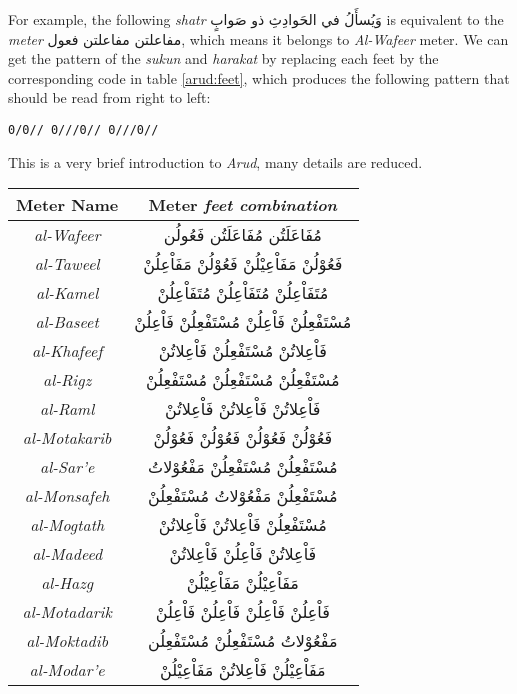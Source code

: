 \documentclass[12pt]{report}
\begin{document}
For example, the following \textit{shatr} \textarabic{وَيُسأَلُ في الحَوادِثِ ذو صَوابٍ} is
equivalent to the \textit{meter} \textarabic{مفاعلتن مفاعلتن فعول}, which means
it belongs to \textit{Al-Wafeer} meter. We can get the pattern of the
\textit{sukun} and \textit{harakat} by replacing each feet by the corresponding
code in table \ref{arud:feet}, which produces the following pattern that should
be read from right to left:%
\begin{flushright}
  {\texttt{0/0// 0///0// 0///0//}} %
\end{flushright}
This is a very brief introduction to \textit{Arud}, many details are reduced.

 


\begin{center}
  \begin{tabular}[h!]{|c|c|} 
    \hline
    \textbf{Meter Name} & \textbf{Meter} \small{\textit{feet combination}} \\ 
    \hline
   \textit{al-Wafeer}    & \textarabic{مُفَاعَلَتُن مُفَاعَلَتُن فَعُولُن} \\ %
   \textit{al-Taweel}    & \textarabic{فَعُوْلُنْ مَفَاْعِيْلُنْ فَعُوْلُنْ مَفَاْعِلُنْ} \\ %
   \textit{al-Kamel}     & \textarabic{مُتَفَاْعِلُنْ مُتَفَاْعِلُنْ مُتَفَاْعِلُنْ} \\%
   \textit{al-Baseet}    & \textarabic{مُسْتَفْعِلُنْ فَاْعِلُنْ مُسْتَفْعِلُنْ فَاْعِلُنْ} \\%
   \textit{al-Khafeef}   & \textarabic{فَاْعِلاتُنْ مُسْتَفْعِلُنْ فَاْعِلاتُنْ} \\ %
   \textit{al-Rigz}      & \textarabic{مُسْتَفْعِلُنْ مُسْتَفْعِلُنْ مُسْتَفْعِلُنْ} \\%
   \textit{al-Raml}      & \textarabic{فَاْعِلاتُنْ فَاْعِلاتُنْ فَاْعِلاتُنْ} \\ %
   \textit{al-Motakarib} & \textarabic{فَعُوْلُنْ فَعُوْلُنْ فَعُوْلُنْ فَعُوْلُنْ} \\%
   \textit{al-Sar'e}     & \textarabic{مُسْتَفْعِلُنْ مُسْتَفْعِلُنْ مَفْعُوْلاتُ} \\%
   \textit{al-Monsafeh}  & \textarabic{مُسْتَفْعِلُنْ مَفْعُوْلاتُ مُسْتَفْعِلُنْ} \\
   \textit{al-Mogtath}   & \textarabic{مُسْتَفْعِلُنْ فَاْعِلاتُنْ فَاْعِلاتُنْ} \\
   \textit{al-Madeed}    & \textarabic{فَاْعِلاتُنْ فَاْعِلُنْ فَاْعِلاتُنْ } \\
   \textit{al-Hazg}      & \textarabic{مَفَاْعِيْلُنْ مَفَاْعِيْلُنْ} \\%
   \textit{al-Motadarik} & \textarabic{فَاْعِلُنْ فَاْعِلُنْ فَاْعِلُنْ فَاْعِلُنْ} \\%
   \textit{al-Moktadib}  & \textarabic{مَفْعُوْلاتُ مُسْتَفْعِلُنْ مُسْتَفْعِلُن} \\
   \textit{al-Modar'e}   & \textarabic{مَفَاْعِيْلُنْ فَاْعِلاتُنْ مَفَاْعِيْلُنْ} \\
    \hline
  \end{tabular}
  \label{arud:meters}
\end{center}
\end{document}
